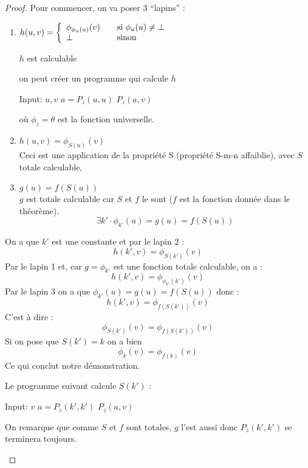 \begin{proof}
Pour commencer, on va poser 3 ``lapins'' :
\begin{enumerate}

	\item
	$ h(u,v) = \left\{
	\begin{array}{l l}
		\phi_{\phi_{u}(u)}(v) & \quad \text{si $\phi_u(u)\neq \bot$}\\
    	\bot & \quad \text{sinon}
	\end{array} \right.$

		$h$ est calculable
		\begin{myrem}
			on peut créer un programme qui calcule $h$
            \begin{algorithmic}
              \STATE Input: $u,v$
              \STATE $a = P_z(u,u)$
              \STATE $P_z(a,v)$
            \end{algorithmic}
            où $\phi_z = \theta$ est la fonction universelle.
		\end{myrem}

	\item $h(u,v)=\phi_{S(u)}(v)$\\
	Ceci est une application de la propriété S (propriété S-m-n affaiblie), avec $S$ totale calculable, 

	\item $g(u)=f(S(u))$\\
	 $g$ est totale calculable car $S$ et $f$ le sont ($f$
		est la fonction donnée dans le théorème).
		\[ \exists k' \cdot \phi_{k'}(u) =g(u)=f(S(u)) \]
\end{enumerate}
On a que $k'$ est une constante et par le lapin 2 :
\[h(k',v) = \phi_{S(k')}(v)\]
Par le lapin 1 et, car $g=\phi_{k'}$ est une fonction totale calculable, on a :
\[h(k',v) = \phi_{\phi_{k'}(k')}(v)\]
Par le lapin 3 on a que $\phi_{k'}(u) = g(u)=f(S(u))$ donc :
\[h(k',v) = \phi_{f(S(k'))}(v)\]
C'est à dire :
\[ \phi_{S(k')}(v) =\phi_{f(S(k'))}(v) \]
Si on pose que $S(k')=k$ on a bien
\[ \phi_{k}(v) = \phi_{f(k)}(v) \]
Ce qui conclut notre démonstration.
		\begin{myrem}
            Le programme suivant calcule  $S(k')$ :
          \begin{algorithmic}
            \STATE Input: $v$
            \STATE $a = P_z(k',k')$
            \STATE $P_z(a,v)$
          \end{algorithmic}
          On remarque que comme $S$ et $f$ sont totales,
          $g$ l'est aussi donc $P_z(k',k')$ se terminera toujours.


\end{myrem}
\end{proof}

